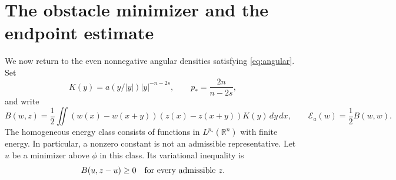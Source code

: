 \documentclass[11pt]{article}
\numberwithin{equation}{section}
\theoremstyle{remark}
\newcommand{\R}{\mathbb R}
\newcommand{\abs}[1]{\lvert #1\rvert}
\newcommand{\dd}{\,d}
\begin{document}
\section{The obstacle minimizer and the endpoint estimate}\label{sec:obstacle}

We now return to the even nonnegative angular densities satisfying \eqref{eq:angular}. Set
\[
 K(y)=a(y/\abs y)\abs y^{-n-2s},\qquad p_*=\frac{2n}{n-2s},
\]
and write
\[
 B(w,z)=\frac12\iint(w(x)-w(x+y))(z(x)-z(x+y))K(y)\dd y\dd x,
 \qquad \mathcal E_a(w)=\frac12 B(w,w).
\]
The homogeneous energy class consists of functions in $L^{p_*}(\R^n)$ with finite energy. In particular, a nonzero constant is not an admissible representative. Let $u$ be a minimizer above $\phi$ in this class. Its variational inequality is
\begin{equation}\label{eq:vi}
 B(u,z-u)\ge0\quad\hbox{for every admissible }z.
\end{equation}
\end{document}
